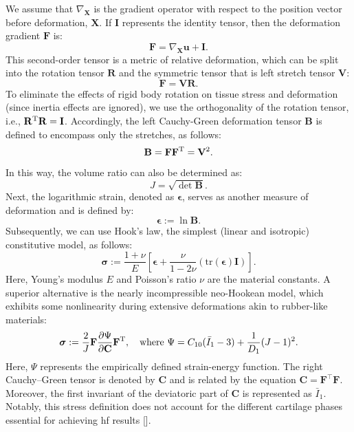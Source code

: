 We assume that $\nabla_\mathbf{X}$ is the gradient operator with respect to the position vector before deformation, $\mathbf{X}$. If $\mathbf{I}$ represents the identity tensor, then the deformation gradient $\mathbf{F}$ is:
%
\begin{equation}
    \mathbf{F} = \nabla_\mathbf{X} \mathbf{u} + \mathbf{I}.
\end{equation}
%
This second-order tensor is a metric of relative deformation, which can be split into the rotation tensor $\mathbf{R}$ and the symmetric tensor that is left stretch tensor $\mathbf{V}$:
%
\begin{equation}
    \mathbf{F} = \mathbf{V} \mathbf{R}. \label{eq1-1}
\end{equation}
%
To eliminate the effects of rigid body rotation on tissue stress and deformation (since inertia effects are ignored), we use the orthogonality of the rotation tensor, i.e., $\mathbf{R}^{\rm T}\mathbf{R} = \mathbf{I}$. Accordingly, the left Cauchy-Green deformation tensor $\mathbf{B}$ is defined to encompass only the stretches, as follows:
%
\begin{equation}
\mathbf{B} = \mathbf{F} \mathbf{F}^{\rm T} = \mathbf{V}^2.
\end{equation}
%
In this way, the volume ratio can also be determined as:
%
\begin{equation}
J = \sqrt{\det \mathbf{B}}.
\end{equation}
%
Next, the logarithmic strain, denoted as $\bm{\epsilon}$, serves as another measure of deformation and is defined by:
%
\begin{equation}
\bm{\epsilon} := \ln \mathbf{B}.
\end{equation}
%
Subsequently, we can use Hook's law, the simplest (linear and isotropic) constitutive model, as follows:
%
\begin{equation}\label{eq-isotropic_elastic}
\bm{\sigma} := \frac{1 + \nu}{E} \left[ \bm{\epsilon} + \frac{\nu}{1 - 2\nu} \left( \mathrm{tr}(\bm{\epsilon}) \mathbf{I} \right) \right].
\end{equation}
%
Here, Young's modulus $E$ and Poisson's ratio $\nu$ are the material constants. A superior alternative is the nearly incompressible neo-Hookean model, which exhibits some nonlinearity during extensive deformations akin to rubber-like materials:
%
\begin{equation}\label{eq-hyperelastic}
\bm{\sigma} :=\frac{2}{J}
\mathbf{F}\frac{\partial\Psi}{\partial\mathbf{C}}\mathbf{F}^{\rm T},
\quad \text{where }
\Psi = C_{10}(\bar{I}_1 - 3) + \frac{1}{D_1}(J - 1)^2.
\end{equation}
%
Here, $\Psi$ represents the empirically defined strain-energy function. The right Cauchy–Green tensor is denoted by \( \mathbf{C} \) and is related by the equation \( \mathbf{C} = \mathbf{F}^{\top} \mathbf{F} \). Moreover, the first invariant of the deviatoric part of \( \mathbf{C} \) is represented as \( \bar{I}_1 \). Notably, this stress definition does not account for the different cartilage phases essential for achieving \ac{hf} results [\cite{gerhard-book}].

